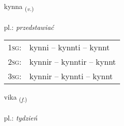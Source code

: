 \documentclass[frontgrid, backgrid]{flacards}\usepackage[]{graphicx}\usepackage[]{xcolor}
\begin{document}
\renewcommand{\flhead}{\vskip5pt \fboxsep=0pt {\small\bfseries\footnotesize Sagnorð | Verb}}
\renewcommand{\fcfoot}{\vskip5pt \fboxsep=0pt \hspace{2pt}{\small\bfseries\footnotesize 1K}}

\renewcommand{\blhead}{\vskip5pt {\small\bfseries\footnotesize Sagnorð | Verb }}
\renewcommand{\bcfoot}{\vskip5pt \hspace{2pt}{\small\bfseries\footnotesize 1K}}


{kynna \small{\textsubscript{(\textit{v.})}} \\[1ex] %
\textphonetic{[cʰɪna]} \\
pl.: \emph{przedstawiać} \\  [2ex]
\renewcommand*{\arraystretch}{0.8}
\begin{tabular}{p{1cm}l}
\textsc{1sg}: & kynni -- kynnti -- kynnt \\ 
\textsc{2sg}: & kynnir -- kynntir -- kynnt \\ 
\textsc{3sg}: & kynnir -- kynnti -- kynnt \\ 
\end{tabular}
}

\renewcommand{\flhead}{\vskip5pt \fboxsep=0pt {\small\bfseries\footnotesize Nafnorð | Noun}}
\renewcommand{\fcfoot}{\vskip5pt \fboxsep=0pt \hspace{2pt}{\small\bfseries\footnotesize 1K}}

\renewcommand{\blhead}{\vskip5pt {\small\bfseries\footnotesize Nafnorð | Noun }}
\renewcommand{\bcfoot}{\vskip5pt \hspace{2pt}{\small\bfseries\footnotesize 1K}}


{vika \small{\textsubscript{(\textit{f.})}} \\[1ex] %
\textphonetic{[vɪːka]} \\
pl.: \emph{tydzień} \\  [2ex]
\renewcommand*{\arraystretch}{0.8}
}
\end{document}
